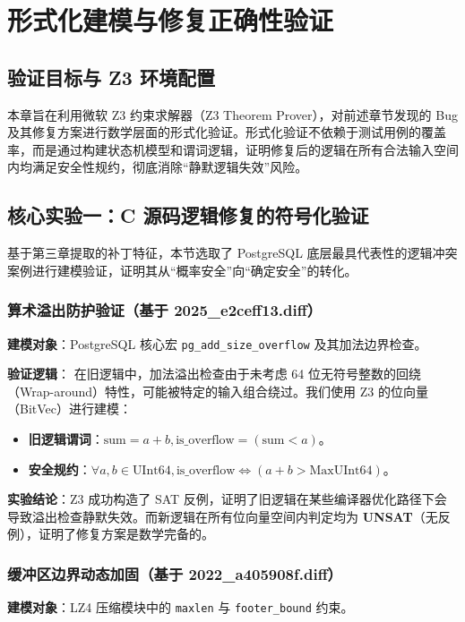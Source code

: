 \chapter{形式化建模与修复正确性验证}\label{chap:formal}

\section{验证目标与 Z3 环境配置}
本章旨在利用微软 Z3 约束求解器（Z3 Theorem Prover），对前述章节发现的 Bug 及其修复方案进行数学层面的形式化验证。形式化验证不依赖于测试用例的覆盖率，而是通过构建状态机模型和谓词逻辑，证明修复后的逻辑在所有合法输入空间内均满足安全性规约，彻底消除“静默逻辑失效”风险。

\section{核心实验一：C 源码逻辑修复的符号化验证}
基于第三章提取的补丁特征，本节选取了 PostgreSQL 底层最具代表性的逻辑冲突案例进行建模验证，证明其从“概率安全”向“确定安全”的转化。

\subsection{算术溢出防护验证（基于 2025\_e2ceff13.diff）}
\textbf{建模对象}：PostgreSQL 核心宏 \texttt{pg\_add\_size\_overflow} 及其加法边界检查。

\textbf{验证逻辑}：
在旧逻辑中，加法溢出检查由于未考虑 64 位无符号整数的回绕（Wrap-around）特性，可能被特定的输入组合绕过。我们使用 Z3 的位向量（BitVec）进行建模：
\begin{itemize}
    \item \textbf{旧逻辑谓词}：$\text{sum} = a + b, \text{is\_overflow} = (\text{sum} < a)$。
    \item \textbf{安全规约}：$\forall a, b \in \text{UInt64}, \text{is\_overflow} \iff (a + b > \text{MaxUInt64})$。
\end{itemize}

\textbf{实验结论}：Z3 成功构造了 SAT 反例，证明了旧逻辑在某些编译器优化路径下会导致溢出检查静默失效。而新逻辑在所有位向量空间内判定均为 \textbf{UNSAT}（无反例），证明了修复方案是数学完备的。

\subsection{缓冲区边界动态加固（基于 2022\_a405908f.diff）}
\textbf{建模对象}：LZ4 压缩模块中的 \texttt{maxlen} 与 \texttt{footer\_bound} 约束。

